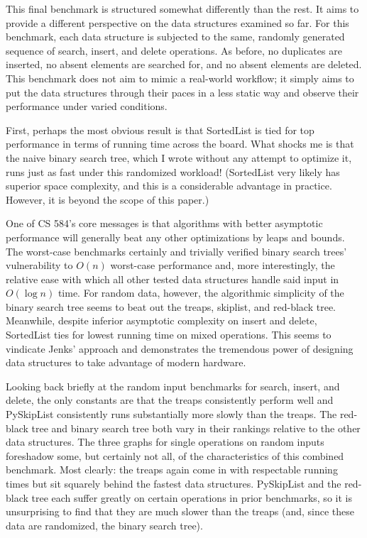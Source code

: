 \documentclass{article}
\begin{document}


This final benchmark is structured somewhat differently than the rest. It aims to provide a different perspective on the data structures examined so far. For this benchmark, each data structure is subjected to the same, randomly generated sequence of search, insert, and delete operations. As before, no duplicates are inserted, no absent elements are searched for, and no absent elements are deleted. This benchmark does not aim to mimic a real-world workflow; it simply aims to put the data structures through their paces in a less static way and observe their performance under varied conditions.

First, perhaps the most obvious result is that SortedList is tied for top performance in terms of running time across the board. What shocks me is that the naive binary search tree, which I wrote without any attempt to optimize it, runs just as fast under this randomized workload! (SortedList very likely has superior space complexity, and this is a considerable advantage in practice. However, it is beyond the scope of this paper.)

One of CS 584's core messages is that algorithms with better asymptotic performance will generally beat any other optimizations by leaps and bounds. The worst-case benchmarks certainly and trivially verified binary search trees' vulnerability to $O(n)$ worst-case performance and, more interestingly, the relative ease with which all other tested data structures handle said input in $O(\log n)$ time. For random data, however, the algorithmic simplicity of the binary search tree seems to beat out the treaps, skiplist, and red-black tree. Meanwhile, despite inferior asymptotic complexity on insert and delete, SortedList ties for lowest running time on mixed operations. This seems to vindicate Jenks' approach and demonstrates the tremendous power of designing data structures to take advantage of modern hardware.

Looking back briefly at the random input benchmarks for search, insert, and delete, the only constants are that the treaps consistently perform well and PySkipList consistently runs substantially more slowly than the treaps. The red-black tree and binary search tree both vary in their rankings relative to the other data structures. The three graphs for single operations on random inputs foreshadow some, but certainly not all, of the characteristics of this combined benchmark. Most clearly: the treaps again come in with respectable running times but sit squarely behind the fastest data structures. PySkipList and the red-black tree each suffer greatly on certain operations in prior benchmarks, so it is unsurprising to find that they are much slower than the treaps (and, since these data are randomized, the binary search tree). 
\end{document}
